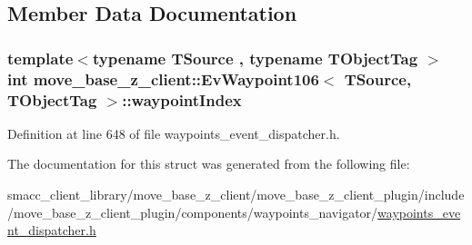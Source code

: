\subsection{Member Data Documentation}
\subsubsection[{\texorpdfstring{waypoint\+Index}{waypointIndex}}]{\setlength{\rightskip}{0pt plus 5cm}template$<$typename T\+Source , typename T\+Object\+Tag $>$ int {\bf move\+\_\+base\+\_\+z\+\_\+client\+::\+Ev\+Waypoint106}$<$ T\+Source, T\+Object\+Tag $>$\+::waypoint\+Index}\hypertarget{structmove__base__z__client_1_1EvWaypoint106_a616178f8e43992152d4537124eb4fe7d}{}\label{structmove__base__z__client_1_1EvWaypoint106_a616178f8e43992152d4537124eb4fe7d}


Definition at line 648 of file waypoints\+\_\+event\+\_\+dispatcher.\+h.



The documentation for this struct was generated from the following file\+:\begin{DoxyCompactItemize}
\item 
smacc\+\_\+client\+\_\+library/move\+\_\+base\+\_\+z\+\_\+client/move\+\_\+base\+\_\+z\+\_\+client\+\_\+plugin/include/move\+\_\+base\+\_\+z\+\_\+client\+\_\+plugin/components/waypoints\+\_\+navigator/\hyperlink{waypoints__event__dispatcher_8h}{waypoints\+\_\+event\+\_\+dispatcher.\+h}\end{DoxyCompactItemize}

